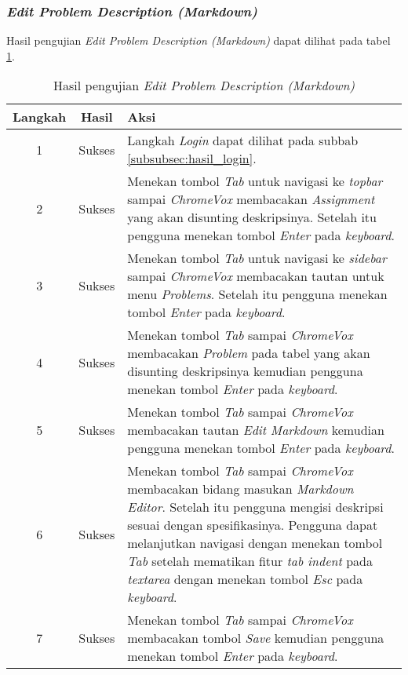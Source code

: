 \subsubsection{\textit{Edit Problem Description (Markdown)}}
\label{subsubsec:hasil_edit_problem_description_markdown}
Hasil pengujian \textit{Edit Problem Description (Markdown)} dapat dilihat pada tabel \ref{tab:hasil_edit_problem_description_markdown}.

\begin{table}[H]
	\centering
	\caption{Hasil pengujian \textit{Edit Problem Description (Markdown)}}
	\label{tab:hasil_edit_problem_description_markdown}
	\begin{tabular}{|c|c|p{12cm}|}
		\toprule
		Langkah & Hasil & Aksi\\
		\midrule
		1 & Sukses & Langkah \textit{Login} dapat dilihat pada subbab \ref{subsubsec:hasil_login}.\\
		2 & Sukses & Menekan tombol \textit{Tab} untuk navigasi ke \textit{topbar} sampai \textit{ChromeVox} membacakan \textit{Assignment} yang akan disunting deskripsinya. Setelah itu pengguna menekan tombol \textit{Enter} pada \textit{keyboard}.\\
		3 & Sukses & Menekan tombol \textit{Tab} untuk navigasi ke \textit{sidebar} sampai \textit{ChromeVox} membacakan tautan untuk menu \textit{Problems}. Setelah itu pengguna menekan tombol \textit{Enter} pada \textit{keyboard}.\\
		4 & Sukses & Menekan tombol \textit{Tab} sampai \textit{ChromeVox} membacakan \textit{Problem} pada tabel yang akan disunting deskripsinya kemudian pengguna menekan tombol \textit{Enter} pada \textit{keyboard}.\\
		5 & Sukses & Menekan tombol \textit{Tab} sampai \textit{ChromeVox} membacakan tautan \textit{Edit Markdown} kemudian pengguna menekan tombol \textit{Enter} pada \textit{keyboard}.\\
		6 & Sukses & Menekan tombol \textit{Tab} sampai \textit{ChromeVox} membacakan bidang masukan \textit{Markdown Editor}. Setelah itu pengguna mengisi deskripsi sesuai dengan spesifikasinya. Pengguna dapat melanjutkan navigasi dengan menekan tombol \textit{Tab} setelah mematikan fitur \textit{tab indent} pada \textit{textarea} dengan menekan tombol \textit{Esc} pada \textit{keyboard}.\\
		7 & Sukses & Menekan tombol \textit{Tab} sampai \textit{ChromeVox} membacakan tombol \textit{Save} kemudian pengguna menekan tombol \textit{Enter} pada \textit{keyboard}.\\
		\bottomrule
	\end{tabular}
\end{table}

